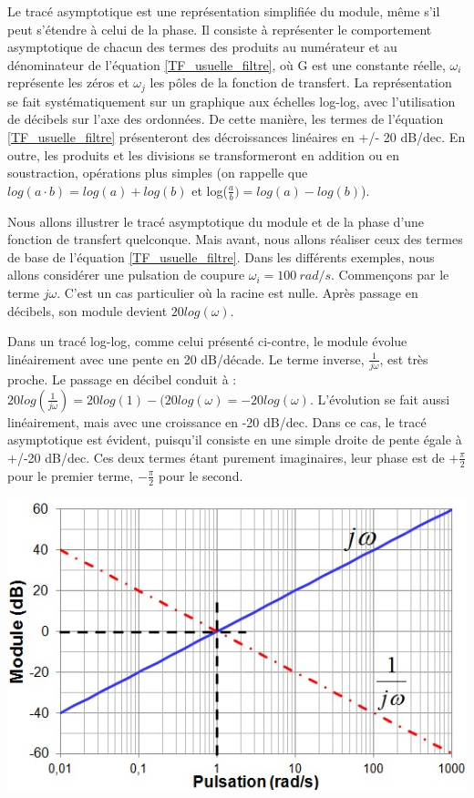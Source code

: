 	Le tracé asymptotique est une représentation simplifiée du module, même s'il peut s'étendre à celui de la phase. Il consiste à représenter le comportement asymptotique de chacun des termes des produits au numérateur et au dénominateur de l'équation \ref{TF_usuelle_filtre}, où G est une constante réelle, $\omega_{i}$ représente les zéros et $\omega_{j}$ les pôles de la fonction de transfert. La représentation se fait systématiquement sur un graphique aux échelles log-log, avec l'utilisation de décibels sur l'axe des ordonnées. De cette manière, les termes de l'équation \ref{TF_usuelle_filtre} présenteront des décroissances linéaires en +/- 20 dB/dec. En outre, les produits et les divisions se transformeront en addition ou en soustraction, opérations plus simples (on rappelle que $log(a \cdot b)=log(a)+log(b)$ et log($\frac{a}{b})=log(a)-log(b)$).
	
	Nous allons illustrer le tracé asymptotique du module et de la phase d'une fonction de transfert quelconque. Mais avant, nous allons réaliser ceux des termes de base de l'équation \ref{TF_usuelle_filtre}. Dans les différents exemples, nous allons considérer une pulsation de coupure $\omega_{i} = 100~rad/s$. Commençons par le terme $j\omega$. C'est un cas particulier où la racine est nulle. Après passage en décibels, son module devient $20log(\omega)$. 
	
	
	\begin{minipage}[l]{0.5\linewidth}
		Dans un tracé log-log, comme celui présenté ci-contre, le module évolue linéairement avec une pente en 20 dB/décade.  Le terme inverse, $\frac{1}{j\omega}$, est très proche. Le passage en décibel conduit à : $20log(\frac{1}{j\omega})=20log(1)-(20log(\omega)=-20log(\omega)$. L'évolution se fait aussi linéairement, mais avec une croissance en -20 dB/dec. Dans ce cas, le tracé asymptotique est évident, puisqu'il consiste en une simple droite de pente égale à +/-20 dB/dec. Ces deux termes étant purement imaginaires, leur phase est de $+\frac{\pi}{2}$ pour le premier terme, $-\frac{\pi}{2}$ pour le second.
	\end{minipage} \hfill
	\begin{minipage}[c]{0.50\linewidth}
		\includegraphics[scale=0.6]{images/Trace_asympt_jw.jpg}	
	\end{minipage}


